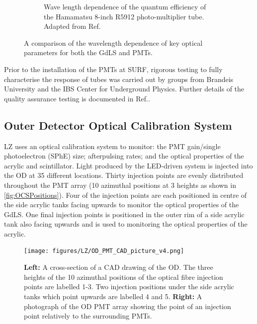 \begin{figure}[h!]
\begin{subfigure}{0.47\textwidth}
         \caption{Wave length dependence of the quantum efficiency of the Hamamatsu 8-inch R5912 photo-multiplier tube. Adapted from Ref.\cite{HamamatsuR5912}}
         \label{fig:ODPMTQE}
     \end{subfigure}
     \caption{A comparison of the wavelength dependence of key optical parameters for both the GdLS and PMTs.}
     \label{fig:ODPMTSpecRes}
\end{figure}
Prior to the installation of the PMTs at SURF, rigorous testing to fully characterise the response of tubes was carried out by groups from Brandeis University and the IBS Center for Underground Physics. Further details of the quality assurance testing is documented in Ref.\cite{lkorley:thesis}.

\subsection{Outer Detector Optical Calibration System}\label{sec:ODOCS}
LZ uses an optical calibration system to monitor: the PMT gain/single photoelectron (SPhE) size; afterpulsing rates; and the optical properties of the acrylic and scintillator. Light produced by the LED-driven system is injected into the OD at 35 different locations. Thirty injection points are evenly distributed throughout the PMT array  (10 azimuthal positions at 3 heights as shown in \autoref{fig:OCSPositions}). Four of the injection points are each positioned in centre of the side acrylic tanks facing upwards to monitor the optical properties of the GdLS. One final injection points is positioned in the outer rim of a side acrylic tank also facing upwards and is used to monitoring the optical properties of the acrylic.
\begin{figure}[h!]
    \centering
    \texttt{[image: figures/LZ/OD\_PMT\_CAD\_picture\_v4.png]}
    \caption{\textbf{Left:} A cross-section of a CAD drawing of the OD. The three  heights of the 10 azimuthal positions of the optical fibre injection points are labelled 1-3. Two injection positions under the side acrylic tanks which point upwards are labelled 4 and 5. \textbf{Right:} A photograph of the OD PMT array showing the point of an injection point relatively to the surrounding PMTs.}
    \label{fig:OCSPositions}
\end{figure}

